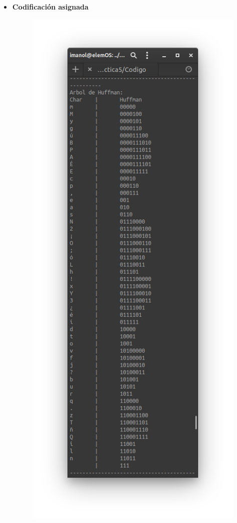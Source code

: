 \begin{itemize}
\begin{figure}[h!]
                \end{figure}
                \newpage
            \item \textbf{Codificación asignada} \\
                \begin{figure}[h!]
                    \centering
                    \includegraphics[scale=.5]{Huffman/ejemplos/ejemplo4/ej4-reph.png}
                \end{figure}
                \newpage
        \end{itemize}
